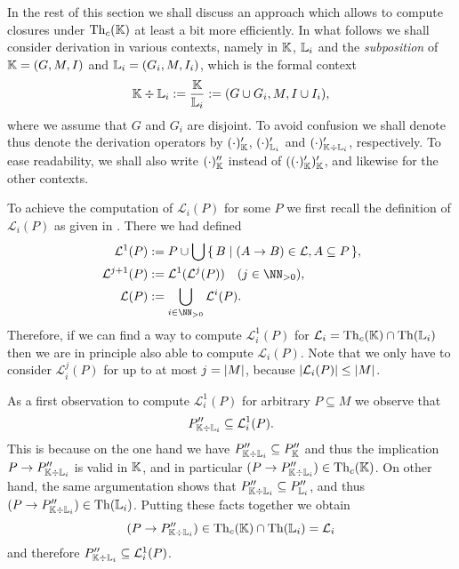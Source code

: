 In the rest of this section we shall discuss an approach which allows to compute closures
under $\operatorname{Th}_{c}({\mathbb{K}})$ at least a bit more efficiently.  In what follows we shall
consider derivation in various contexts, namely in ${\mathbb{K}}$, ${\mathbb{L}}_{i}$ and the
\emph{subposition} of ${\mathbb{K}} = (G, M, I)$ and ${\mathbb{L}}_{i} = (G_{i}, M, I_{i})$, which is
the formal context
\begin{equation*}
  {\ensuremath{\mathbb{K}}} \div {\ensuremath{\mathbb{L}}}_{i} := \frac {{\mathbb{K}}} {{\mathbb{L}}_{i}} := (G \cup G_{i}, M, I \cup I_{i}),
\end{equation*}
where we assume that $G$ and $G_{i}$ are disjoint.  To avoid confusion we shall denote
thus denote the derivation operators by $(\cdot)'_{{\mathbb{K}}}$, $(\cdot)'_{{\mathbb{L}}_{i}}$ and
$(\cdot)'_{{\mathbb{K}} \div {\ensuremath{\mathbb{L}}}_{i}}$, respectively.  To ease readability, we shall also
write $(\cdot)''_{{\mathbb{K}}}$ instead of $((\cdot)'_{{\mathbb{K}}})'_{{\mathbb{K}}}$, and likewise for
the other contexts.

To achieve the computation of $\mathcal{L}_{i}(P)$ for some $P$ we first recall the
definition of $\mathcal{L}_{i}(P)$ as given in .  There
we had defined
\begin{align*}
  \mathcal{L}^{1}(P) &:= P \cup \bigcup \set{ B \mid (A \to B) \in \mathcal{L}, A
    \subseteq P }, \\
  \mathcal{L}^{j+1}(P) &:= \mathcal{L}^{1}(\mathcal{L}^{j}(P)) \quad (j \in \NN_{> 0}), \\
  \mathcal{L}(P) & := \bigcup_{i \in \NN_{>0}} \mathcal{L}^{i}(P).
\end{align*}
Therefore, if we can find a way to compute $\mathcal{L}_{i}^{1}(P)$ for $\mathcal{L}_{i} =
\operatorname{Th}_{c}({\mathbb{K}}) \cap \operatorname{Th}({\mathbb{L}}_{i})$ then we are in principle also able to compute
$\mathcal{L}_{i}(P)$.  Note that we only have to consider $\mathcal{L}_{i}^{j}(P)$ for up
to at most $j = \lvert M\rvert$, because $\lvert \mathcal{L}_{i}(P) \rvert \le \lvert M\rvert$.

As a first observation to compute $\mathcal{L}_{i}^{1}(P)$ for arbitrary $P \subseteq M$
we observe that
\begin{equation}
  \label{eq:41}
  P_{{\mathbb{K}} \div {\ensuremath{\mathbb{L}}}_{i}}'' \subseteq \mathcal{L}_{i}^{1}(P).
\end{equation}
This is because on the one hand we have $P_{{\mathbb{K}} \div {\ensuremath{\mathbb{L}}}_{i}}'' \subseteq P_{{\mathbb{K}}}''$ and thus the implication $P \to P_{{\mathbb{K}} \div {\ensuremath{\mathbb{L}}}_{i}}''$ is valid in ${\mathbb{K}}$, and in particular $(P \to P_{{\mathbb{K}} \div {\ensuremath{\mathbb{L}}}_{i}}'') \in \operatorname{Th}_{c}({\mathbb{K}})$.
On other hand, the same argumentation shows that $P_{{\mathbb{K}} \div {\ensuremath{\mathbb{L}}}_{i}}'' \subseteq
P_{{\mathbb{L}}_{i}}''$, and thus $(P \to P_{{\mathbb{K}} \div {\ensuremath{\mathbb{L}}}_{i}}'') \in \operatorname{Th}({\mathbb{L}}_{i})$.
Putting these facts together we obtain
\begin{equation*}
  (P \to P_{{\mathbb{K}} \div {\ensuremath{\mathbb{L}}}_{i}}'') \in \operatorname{Th}_{c}({\mathbb{K}}) \cap \operatorname{Th}({\mathbb{L}}_{i}) = \mathcal{L}_{i}
\end{equation*}
and therefore $P_{{\mathbb{K}} \div {\ensuremath{\mathbb{L}}}_{i}}'' \subseteq \mathcal{L}_{i}^{1}(P)$.

